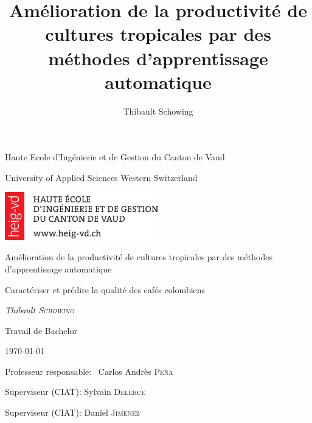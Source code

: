 \documentclass[11pt,a4paper]{report}
\author{Thibault Schowing}
\title{Amélioration de la productivité de cultures tropicales par des méthodes d'apprentissage automatique}
\makeatletter
\newif\if@mainmatter \@mainmattertrue
\newcommand\frontmatter{%
	\cleardoublepage
	\@mainmatterfalse
	\pagenumbering{roman}}
\newcommand\blankpage{%
	\null
	\thispagestyle{empty}%
	\addtocounter{page}{-1}%
	\newpage}
\makeatother
\begin{document}
	
	
	\dominitoc

	\begin{titlepage}
		\centering
		
		\small{Haute Ecole d'Ingénierie et de Gestion du Canton de Vaud  \par}
		\footnotesize{University of Applied Sciences Western Switzerland\par}
		\vspace{1cm}
		
		\includegraphics[width=0.5\textwidth]{HEIG-VDLogo}\par
		
		\vspace{1cm}
		\Large{Amélioration de la productivité de cultures tropicales par des méthodes d'apprentissage automatique\par}
		\vspace{1.5cm}
		\small{Caractériser et prédire la qualité des cafés colombiens \par}
		\vspace{2cm}
		\small\textit{Thibault \textsc{Schowing}}\par
		\small{Travail de Bachelor}\par
		\small{\today\par}
		
		\vfill
		Professeur responsable: ~Carlos Andrès \textsc{Peña}\par
		Superviseur (CIAT): Sylvain \textsc{Delerce} \par
		Superviseur (CIAT): Daniel \textsc{Jimenez}
		
		
	\end{titlepage}
	
	\afterpage{\blankpage}
	
	\frontmatter
	
	
\end{document}
